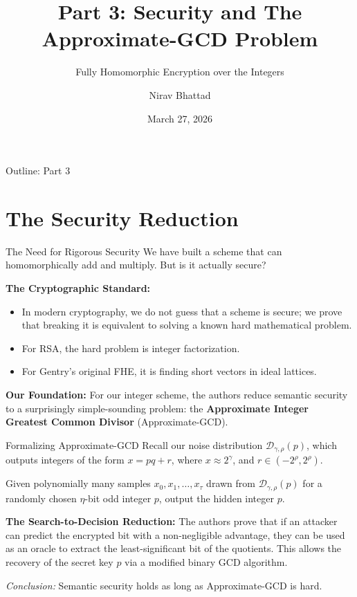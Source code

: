 \documentclass[10pt, aspectratio=169]{beamer}
\title[Security \& Approx-GCD]{Part 3: Security and The Approximate-GCD Problem}
\subtitle{Fully Homomorphic Encryption over the Integers}
\author{Nirav Bhattad}
\date{March 27, 2026}
\begin{document}
\frame{\titlepage}

\begin{frame}{Outline: Part 3}
    \tableofcontents
\end{frame}

\section{The Security Reduction}
\begin{frame}{The Need for Rigorous Security}
    We have built a scheme that can homomorphically add and multiply. But is it actually secure?
    \pause
    
    \vspace{0.3cm}
    \textbf{The Cryptographic Standard:}
    \begin{itemize}
        \item In modern cryptography, we do not guess that a scheme is secure; we prove that breaking it is equivalent to solving a known hard mathematical problem.
        \item For RSA, the hard problem is integer factorization.
        \item For Gentry's original FHE, it is finding short vectors in ideal lattices.
    \end{itemize}
    \pause
    
    \vspace{0.3cm}
    \textbf{Our Foundation:}
    For our integer scheme, the authors reduce semantic security to a surprisingly simple-sounding problem: the \textbf{Approximate Integer Greatest Common Divisor} (Approximate-GCD).
\end{frame}

\begin{frame}{Formalizing Approximate-GCD}
    Recall our noise distribution $\mathcal{D}_{\gamma,\rho}(p)$, which outputs integers of the form $x = pq + r$, where $x \approx 2^\gamma$, and $r \in (-2^\rho, 2^\rho)$.
    \pause

    \vspace{0.3cm}
    \begin{definition}
    Given polynomially many samples $x_0, x_1, \dots, x_\tau$ drawn from $\mathcal{D}_{\gamma,\rho}(p)$ for a randomly chosen $\eta$-bit odd integer $p$, output the hidden integer $p$.
    \end{definition}
    \pause
    
    \vspace{0.3cm}
    \textbf{The Search-to-Decision Reduction:}
    The authors prove that if an attacker can predict the encrypted bit with a non-negligible advantage, they can be used as an oracle to extract the least-significant bit of the quotients. This allows the recovery of the secret key $p$ via a modified binary GCD algorithm. 
    
    \textit{Conclusion:} Semantic security holds as long as Approximate-GCD is hard.
\end{frame}
\end{document}

